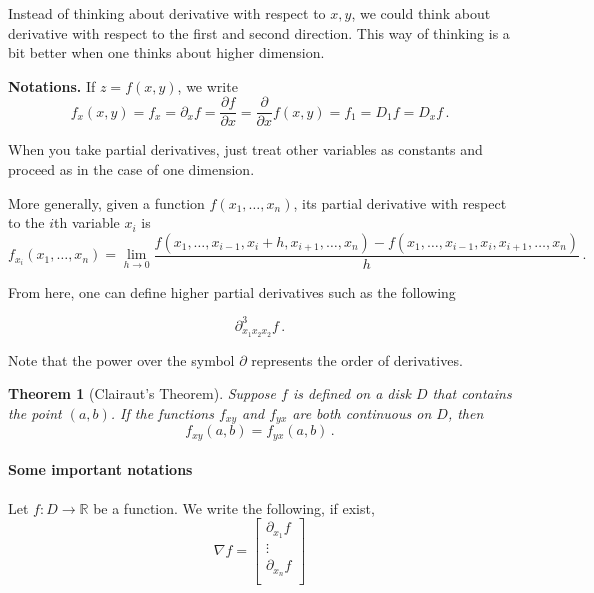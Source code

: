 \documentclass[
]{article}
\newtheorem{theorem}{Theorem}[section]
\theoremstyle{definition}
\theoremstyle{definition}
\theoremstyle{definition}
\theoremstyle{definition}
\theoremstyle{remark}
\begin{document}
Instead of thinking about derivative with respect to \(x,y\), we could think
about derivative with respect to the first and second direction.
This way of thinking is a bit better when one thinks about higher dimension.

\textbf{Notations.} If \(z = f(x,y)\), we write
\begin{equation*}
    f_x(x,y) = f_x = \partial_x f =  \frac{\partial f}{\partial x} = \frac{\partial}{\partial x} f(x,y) = f_1 = D_1 f = D_x f \,.
\end{equation*}

When you take partial derivatives, just treat other variables as constants and proceed as
in the case of one dimension.

More generally,
given a function \(f(x_1, \dots, x_n)\), its partial derivative with respect
to the \(i\)th variable \(x_i\) is
\begin{equation*}
    f_{x_i}(x_1, \dots, x_n) 
    = \lim_{h\to 0} \frac{ f(x_1, \dots, x_{i-1}, x_i + h , x_{i+1}, \dots, x_n) - f(x_1, \dots, x_{i-1}, x_i  , x_{i+1}, \dots, x_n)}{h} \,.
\end{equation*}

From here, one can define higher partial derivatives such as the following

\begin{equation*}
    \partial^3_{x_1 x_2 x_2}  f\,.
\end{equation*}

Note that the power over the symbol \(\partial\) represents the order of derivatives.

\begin{theorem}[Clairaut's Theorem]
Suppose \(f\) is defined on a disk \(D\) that contains the point \((a,b)\).
If the functions \(f_{xy}\) and \(f_{yx}\) are both continuous on \(D\), then
\begin{equation*}
    f_{xy}(a,b) = f_{yx}(a,b) \,.
\end{equation*}
\end{theorem}

\hypertarget{some-important-notations}{%
\paragraph*{Some important notations}\label{some-important-notations}}

Let \(f:D \to \mathbb{R}\) be a function. We write the following, if exist,
\begin{equation*}
    \nabla f = \begin{bmatrix}
        \partial_{x_1} f\\
        \vdots \\
        \partial_{x_n} f\\
    \end{bmatrix}
\end{equation*}
\end{document}
